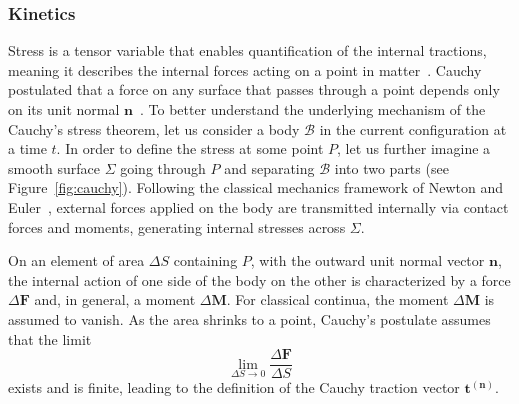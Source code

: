\documentclass[a4paper,11pt]{article}
\begin{document}
\subsubsection{Kinetics}
\label{kin}

Stress is a tensor variable that enables quantiﬁcation of the internal tractions, meaning it describes the internal forces acting on a point in matter~\cite{holzapfel2002nonlinear}. Cauchy postulated that a force on any surface that passes through a point depends only on its unit normal $\mathbf{n}$~\cite{noll1973lectures}. To better understand the underlying mechanism of the Cauchy's stress theorem, let us consider a body $\mathscr{B}$ in the current conﬁguration at a time $t$. In order to deﬁne the stress at some point $P$, let us further imagine a smooth surface $\Sigma$ going through $P$ and separating $\mathscr{B}$ into two parts (see Figure~\ref{fig:cauchy}). Following the classical mechanics framework of Newton and Euler~\cite{truesdell2004non}, external forces applied on the body are transmitted internally via contact forces and moments, generating internal stresses across $\Sigma$.

On an element of area $\Delta S$ containing $P$, with the outward unit normal vector $\mathbf{n}$, the internal action of one side of the body on the other is characterized by a force $\Delta \mathbf{F}$ and, in general, a moment $\Delta \mathbf{M}$. For classical continua, the moment $\Delta \mathbf{M}$ is assumed to vanish. As the area shrinks to a point, Cauchy’s postulate assumes that the limit
\begin{equation}
\lim_{\Delta S \to 0} \frac{\Delta \mathbf{F}}{\Delta S}
\end{equation}
exists and is finite, leading to the definition of the Cauchy traction vector $\mathbf{t}^{(\mathbf{n})}$.
\end{document}
